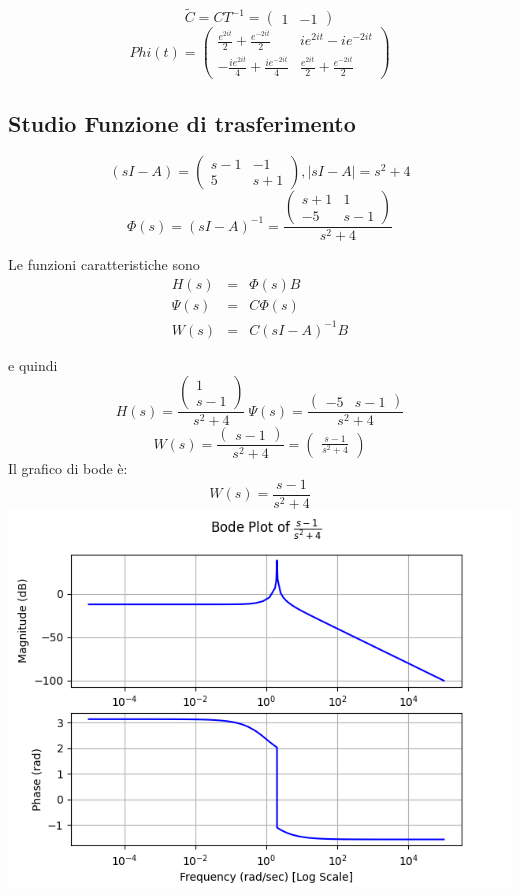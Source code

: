 \documentclass{article}
\begin{document}
\[ \widetilde{C} = C T^{-1} = \left(\begin{matrix}1 & -1\end{matrix}\right) \]
\[Phi(t) = \left(\begin{matrix}\frac{e^{2 i t}}{2} + \frac{e^{- 2 i t}}{2} & i e^{2 i t} - i e^{- 2 i t}\\- \frac{i e^{2 i t}}{4} + \frac{i e^{- 2 i t}}{4} & \frac{e^{2 i t}}{2} + \frac{e^{- 2 i t}}{2}\end{matrix}\right) \]

\subsection{Studio Funzione di trasferimento}

\[ (sI-A) = \left(\begin{matrix}s - 1 & -1\\5 & s + 1\end{matrix}\right), |sI-A| = s^{2} + 4 \]
\[ \Phi(s) = (sI-A)^{-1} = \frac{\left(\begin{matrix}s + 1 & 1\\-5 & s - 1\end{matrix}\right)}{s^{2} + 4} \]

Le funzioni caratteristiche sono \[\begin{array}{rcl}  H(s) & = & \Phi(s)B \\ \Psi(s) & = & C \Phi(s)\\ W(s) & = & C(sI-A)^{-1}B  \end{array} \]

e quindi \[ H(s)  =  \frac{\left(\begin{matrix}1\\s - 1\end{matrix}\right)}{s^{2} + 4} \ \Psi(s) = \frac{\left(\begin{matrix}-5 & s - 1\end{matrix}\right)}{s^{2} + 4} \]
\[ W(s)  =  \frac{\left(\begin{matrix}s - 1\end{matrix}\right)}{s^{2} + 4} = \left(\begin{matrix}\frac{s - 1}{s^{2} + 4}\end{matrix}\right)  \] 
Il grafico di bode è:
\[ W(s) = \frac{s - 1}{s^{2} + 4} \]\includegraphics[scale = 0.5]{figures/bode_1189658.png}
\end{document}
